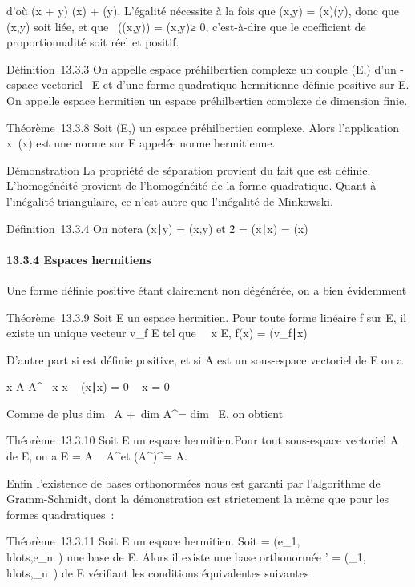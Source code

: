 \documentclass[]{article}
\begin{document}
d'où \sqrt\Phi(x + y) \leq\sqrt\Phi(x) +
\sqrt\Phi(y). L'égalité nécessite à la fois que
\phi(x,y) = \sqrt\Phi(x)\Phi(y), donc que
(x,y) soit liée, et que
\mathrmRe~(\phi(x,y)) =
\phi(x,y)≥ 0, c'est-à-dire que le coefficient de
proportionnalité soit réel et positif.

Définition~13.3.3 On appelle espace préhilbertien complexe un couple
(E,\Phi) d'un -espace vectoriel ~E et d'une forme quadratique hermitienne
définie positive sur E. On appelle espace hermitien un espace
préhilbertien complexe de dimension finie.

Théorème~13.3.8 Soit (E,\Phi) un espace préhilbertien complexe. Alors
l'application x\mapsto~\sqrt\Phi(x)
est une norme sur E appelée norme hermitienne.

Démonstration La propriété de séparation provient du fait que \Phi est
définie. L'homogénéité provient de l'homogénéité de la forme
quadratique. Quant à l'inégalité triangulaire, ce n'est autre que
l'inégalité de Minkowski.

Définition~13.3.4 On notera (x∣y) = \phi(x,y) et
\x\^2 =
(x∣x) = \Phi(x)

\paragraph{13.3.4 Espaces hermitiens}

Une forme définie positive étant clairement non dégénérée, on a bien
évidemment

Théorème~13.3.9 Soit E un espace hermitien. Pour toute forme linéaire f
sur E, il existe un unique vecteur v_f \in E tel que
\forall~~x \in E, f(x) =
(v_f∣x)

D'autre part si \Phi est définie positive, et si A est un sous-espace
vectoriel de E on a

x \in A \bigcap A^\bot\rigtharrow~ x \bot x \rigtharrow~ (x∣x) = 0 \rigtharrow~ x
= 0

Comme de plus dim~ A +\
dim A^\bot = dim~ E, on obtient

Théorème~13.3.10 Soit E un espace hermitien.Pour tout sous-espace
vectoriel A de E, on a E = A \oplus~ A^\bot et
(A^\bot)^\bot = A.

Enfin l'existence de bases orthonormées nous est garanti par
l'algorithme de Gramm-Schmidt, dont la démonstration est strictement la
même que pour les formes quadratiques~:

Théorème~13.3.11 Soit E un espace hermitien. Soit  =
(e_1,\\ldots,e_n~)
une base de E. Alors il existe une base orthonormée ' =
(\epsilon_1,\\ldots,\epsilon_n~)
de E vérifiant les conditions équivalentes suivantes
\end{document}
